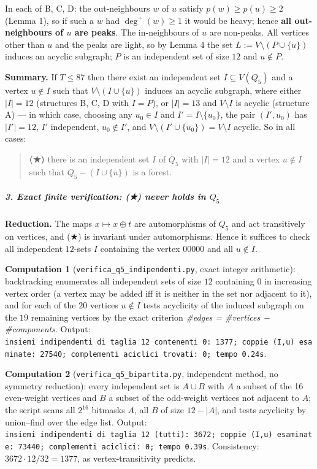 \documentclass[11pt,a4paper]{article}
\begin{document}
In each of B, C, D: the out-neighbours \(w\) of \(u\) satisfy
\(p(w)\ge p(u)\ge2\) (Lemma 1), so if such a \(w\) had \(\deg^+(w)\ge1\)
it would be heavy; hence \textbf{all out-neighbours of \(u\) are peaks}.
The in-neighbours of \(u\) are non-peaks. All vertices other than \(u\)
and the peaks are light, so by Lemma 4 the set
\(L:=V\setminus(P\cup\{u\})\) induces an acyclic subgraph; \(P\) is an
independent set of size \(12\) and \(u\notin P\).

\textbf{Summary.} If \(T\le 87\) then there exist an independent set
\(I\subseteq V(Q_5)\) and a vertex \(u\notin I\) such that
\(V\setminus(I\cup\{u\})\) induces an acyclic subgraph, where either
\(|I|=12\) (structures B, C, D with \(I=P\)), or \(|I|=13\) and
\(V\setminus I\) is acyclic (structure A) --- in which case, choosing
any \(u_0\in I\) and \(I'=I\setminus\{u_0\}\), the pair \((I',u_0)\) has
\(|I'|=12\), \(I'\) independent, \(u_0\notin I'\), and
\(V\setminus(I'\cup\{u_0\})=V\setminus I\) acyclic. So in all cases:

\begin{quote}
\textbf{(★)} there is an independent set \(I\) of \(Q_5\) with
\(|I|=12\) and a vertex \(u\notin I\) such that \(Q_5-(I\cup\{u\})\) is
a forest.
\end{quote}

\subparagraph{\texorpdfstring{3. Exact finite verification: (★) never
holds in
\(Q_5\)}{3. Exact finite verification: (★) never holds in Q\_5}}\label{exact-finite-verification-never-holds-in-q_5}

\textbf{Reduction.} The maps \(x\mapsto x\oplus t\) are automorphisms of
\(Q_5\) and act transitively on vertices, and (★) is invariant under
automorphisms. Hence it suffices to check all independent \(12\)-sets
\(I\) containing the vertex \(00000\) and all \(u\notin I\).

\textbf{Computation 1} (\texttt{verifica\_q5\_indipendenti.py}, exact
integer arithmetic): backtracking enumerates all independent sets of
size \(12\) containing \(0\) in increasing vertex order (a vertex may be
added iff it is neither in the set nor adjacent to it), and for each of
the \(20\) vertices \(u\notin I\) tests acyclicity of the induced
subgraph on the \(19\) remaining vertices by the exact criterion
\emph{\#edges = \#vertices − \#components}. Output:
\texttt{insiemi\ indipendenti\ di\ taglia\ 12\ contenenti\ 0:\ 1377;\ coppie\ (I,u)\ esaminate:\ 27540;\ complementi\ aciclici\ trovati:\ 0;\ tempo\ 0.24s}.

\textbf{Computation 2} (\texttt{verifica\_q5\_bipartita.py}, independent
method, no symmetry reduction): every independent set is \(A\cup B\)
with \(A\) a subset of the 16 even-weight vertices and \(B\) a subset of
the odd-weight vertices not adjacent to \(A\); the script scans all
\(2^{16}\) bitmasks \(A\), all \(B\) of size \(12-|A|\), and tests
acyclicity by union--find over the edge list. Output:
\texttt{insiemi\ indipendenti\ di\ taglia\ 12\ (tutti):\ 3672;\ coppie\ (I,u)\ esaminate:\ 73440;\ complementi\ aciclici:\ 0;\ tempo\ 0.39s}.
Consistency: \(3672\cdot 12/32=1377\), as vertex-transitivity predicts.
\end{document}
